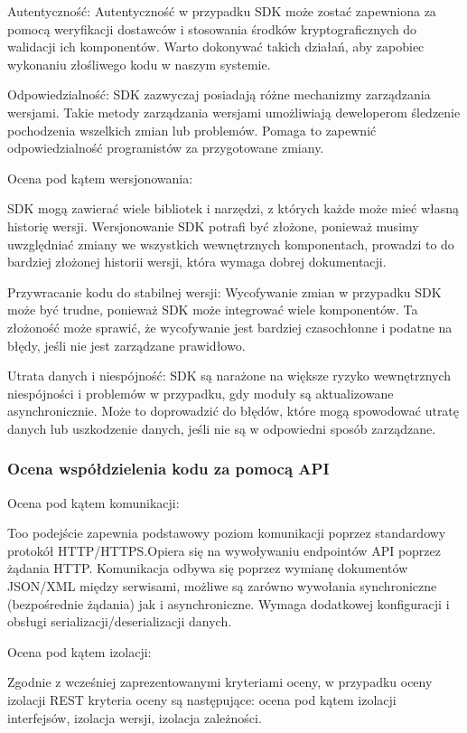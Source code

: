 \documentclass[runningheads,12pt]{llncs}
\begin{document}
Autentyczność: Autentyczność w przypadku SDK może zostać zapewniona za pomocą weryfikacji dostawców i stosowania środków kryptograficznych do walidacji ich komponentów. Warto dokonywać takich działań, aby zapobiec wykonaniu złośliwego kodu w naszym systemie. ~\cite[para 7]{azure2020}

Odpowiedzialność: SDK zazwyczaj posiadają różne mechanizmy zarządzania wersjami. Takie metody zarządzania wersjami umożliwiają deweloperom śledzenie pochodzenia wszelkich zmian lub problemów. Pomaga to zapewnić odpowiedzialność programistów za przygotowane zmiany. ~\cite[para 7]{azure2020}

Ocena pod kątem wersjonowania:

SDK mogą zawierać wiele bibliotek i narzędzi, z których każde może mieć własną historię wersji. Wersjonowanie SDK potrafi być złożone, ponieważ musimy uwzględniać zmiany we wszystkich wewnętrznych komponentach, prowadzi to do bardziej złożonej historii wersji, która wymaga dobrej dokumentacji. ~\cite[para. 3]{azure2020}

Przywracanie kodu do stabilnej wersji: Wycofywanie zmian w przypadku SDK może być trudne, ponieważ SDK może integrować wiele komponentów. Ta złożoność może sprawić, że wycofywanie jest bardziej czasochłonne i podatne na błędy, jeśli nie jest zarządzane prawidłowo. ~\cite[para. 3]{azure2020}

Utrata danych i niespójność: SDK są narażone na większe ryzyko wewnętrznych niespójności i problemów w przypadku, gdy moduły są aktualizowane asynchronicznie. Może to doprowadzić do błędów, które mogą spowodować utratę danych lub uszkodzenie danych, jeśli nie są w odpowiedni sposób zarządzane. ~\cite[para. 3]{azure2020}
\subsubsection{Ocena współdzielenia kodu za pomocą API}

Ocena pod kątem komunikacji: 

Too podejście zapewnia podstawowy poziom komunikacji poprzez standardowy protokół HTTP/HTTPS.Opiera się na wywoływaniu endpointów API poprzez żądania HTTP. Komunikacja odbywa się poprzez wymianę dokumentów JSON/XML między serwisami, możliwe są zarówno wywołania synchroniczne (bezpośrednie żądania) jak i asynchroniczne. Wymaga dodatkowej konfiguracji i obsługi serializacji/deserializacji danych.

Ocena pod kątem izolacji:

Zgodnie z wcześniej zaprezentowanymi kryteriami oceny, w przypadku oceny izolacji REST kryteria oceny są następujące: ocena pod kątem izolacji interfejsów, izolacja wersji, izolacja zależności.
\end{document}
